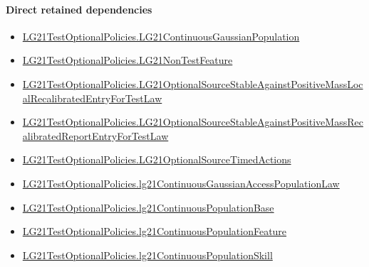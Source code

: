 \documentclass[10pt]{article}
\begin{document}
\paragraph{Direct retained dependencies}
\begin{itemize}\raggedright
\item \hyperlink{paper-prerequisite-f5e1c886d250142b}{LG21\allowbreak{}Test\allowbreak{}Optional\allowbreak{}Policies.\allowbreak{}LG21\allowbreak{}Continuous\allowbreak{}Gaussian\allowbreak{}Population}
\item \hyperlink{governing-declaration-81cb73bf3869c56d}{LG21\allowbreak{}Test\allowbreak{}Optional\allowbreak{}Policies.\allowbreak{}LG21\allowbreak{}Non\allowbreak{}Test\allowbreak{}Feature}
\item \hyperlink{governing-declaration-cdc1e1fec1bc9309}{LG21\allowbreak{}Test\allowbreak{}Optional\allowbreak{}Policies.\allowbreak{}LG21\allowbreak{}Optional\allowbreak{}Source\allowbreak{}Stable\allowbreak{}Against\allowbreak{}Positive\allowbreak{}Mass\allowbreak{}Local\allowbreak{}Recalibrated\allowbreak{}Entry\allowbreak{}For\allowbreak{}Test\allowbreak{}Law}
\item \hyperlink{governing-declaration-2308f52507427ac8}{LG21\allowbreak{}Test\allowbreak{}Optional\allowbreak{}Policies.\allowbreak{}LG21\allowbreak{}Optional\allowbreak{}Source\allowbreak{}Stable\allowbreak{}Against\allowbreak{}Positive\allowbreak{}Mass\allowbreak{}Recalibrated\allowbreak{}Report\allowbreak{}Entry\allowbreak{}For\allowbreak{}Test\allowbreak{}Law}
\item \hyperlink{governing-declaration-c053cef5da7104c1}{LG21\allowbreak{}Test\allowbreak{}Optional\allowbreak{}Policies.\allowbreak{}LG21\allowbreak{}Optional\allowbreak{}Source\allowbreak{}Timed\allowbreak{}Actions}
\item \hyperlink{governing-declaration-fa49b6c4b938413f}{LG21\allowbreak{}Test\allowbreak{}Optional\allowbreak{}Policies.\allowbreak{}lg21\allowbreak{}Continuous\allowbreak{}Gaussian\allowbreak{}Access\allowbreak{}Population\allowbreak{}Law}
\item \hyperlink{governing-declaration-3b5146b167dee236}{LG21\allowbreak{}Test\allowbreak{}Optional\allowbreak{}Policies.\allowbreak{}lg21\allowbreak{}Continuous\allowbreak{}Population\allowbreak{}Base}
\item \hyperlink{governing-declaration-f07391974a356bb7}{LG21\allowbreak{}Test\allowbreak{}Optional\allowbreak{}Policies.\allowbreak{}lg21\allowbreak{}Continuous\allowbreak{}Population\allowbreak{}Feature}
\item \hyperlink{governing-declaration-339ce55dcb78dfb9}{LG21\allowbreak{}Test\allowbreak{}Optional\allowbreak{}Policies.\allowbreak{}lg21\allowbreak{}Continuous\allowbreak{}Population\allowbreak{}Skill}

\end{itemize}
\end{document}
